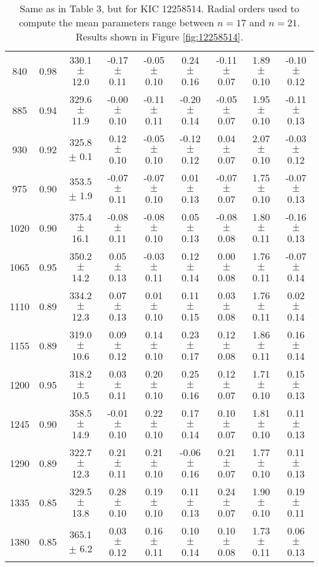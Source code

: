 \documentclass[twocolumn]{aastex61}%
\begin{document}
\begin{table*}[ht]
\begin{tabular}{ccc|ccccc|c}
840 & 0.98 & 330.1 $\pm$ 12.0 & -0.17 $\pm$ 0.11 & -0.05 $\pm$ 0.10 & 0.24 $\pm$ 0.16 & -0.11 $\pm$ 0.07 & 1.89 $\pm$ 0.10 & -0.10 $\pm$ 0.12\\
885 & 0.94 & 329.6 $\pm$ 11.9 & -0.00 $\pm$ 0.10 & -0.11 $\pm$ 0.11 & -0.20 $\pm$ 0.14 & -0.05 $\pm$ 0.07 & 1.95 $\pm$ 0.10 & -0.11 $\pm$ 0.13\\
930 & 0.92 & 325.8 $\pm$ 0.1 & 0.12 $\pm$ 0.10 & -0.05 $\pm$ 0.10 & -0.12 $\pm$ 0.12 & 0.04 $\pm$ 0.07 & 2.07 $\pm$ 0.10 & -0.03 $\pm$ 0.12\\
975 & 0.90 & 353.5 $\pm$ 1.9 & -0.07 $\pm$ 0.11 & -0.07 $\pm$ 0.10 & 0.01 $\pm$ 0.13 & -0.07 $\pm$ 0.07 & 1.75 $\pm$ 0.10 & -0.07 $\pm$ 0.13\\
1020 & 0.90 & 375.4 $\pm$ 16.1 & -0.08 $\pm$ 0.11 & -0.08 $\pm$ 0.10 & 0.05 $\pm$ 0.13 & -0.08 $\pm$ 0.08 & 1.80 $\pm$ 0.11 & -0.16 $\pm$ 0.13\\
1065 & 0.95 & 350.2 $\pm$ 14.2 & 0.05 $\pm$ 0.13 & -0.03 $\pm$ 0.11 & 0.12 $\pm$ 0.14 & 0.00 $\pm$ 0.08 & 1.76 $\pm$ 0.11 & -0.07 $\pm$ 0.14\\
1110 & 0.89 & 334.2 $\pm$ 12.3 & 0.07 $\pm$ 0.13 & 0.01 $\pm$ 0.10 & 0.11 $\pm$ 0.15 & 0.03 $\pm$ 0.08 & 1.76 $\pm$ 0.11 & 0.02 $\pm$ 0.14\\
1155 & 0.89 & 319.0 $\pm$ 10.6 & 0.09 $\pm$ 0.12 & 0.14 $\pm$ 0.10 & 0.23 $\pm$ 0.17 & 0.12 $\pm$ 0.08 & 1.86 $\pm$ 0.11 & 0.16 $\pm$ 0.14\\
1200 & 0.95 & 318.2 $\pm$ 10.5 & 0.03 $\pm$ 0.11 & 0.20 $\pm$ 0.10 & 0.25 $\pm$ 0.16 & 0.12 $\pm$ 0.07 & 1.71 $\pm$ 0.10 & 0.15 $\pm$ 0.13\\
1245 & 0.90 & 358.5 $\pm$ 14.9 & -0.01 $\pm$ 0.10 & 0.22 $\pm$ 0.10 & 0.17 $\pm$ 0.14 & 0.10 $\pm$ 0.07 & 1.81 $\pm$ 0.10 & 0.11 $\pm$ 0.13\\
1290 & 0.89 & 322.7 $\pm$ 12.3 & 0.21 $\pm$ 0.11 & 0.21 $\pm$ 0.10 & -0.06 $\pm$ 0.16 & 0.21 $\pm$ 0.07 & 1.77 $\pm$ 0.10 & 0.11 $\pm$ 0.13\\
1335 & 0.85 & 329.5 $\pm$ 13.8 & 0.28 $\pm$ 0.10 & 0.19 $\pm$ 0.10 & 0.11 $\pm$ 0.13 & 0.24 $\pm$ 0.07 & 1.90 $\pm$ 0.10 & 0.19 $\pm$ 0.11\\
1380 & 0.85 & 365.1 $\pm$ 6.2 & 0.03 $\pm$ 0.12 & 0.16 $\pm$ 0.11 & 0.10 $\pm$ 0.14 & 0.10 $\pm$ 0.08 & 1.73 $\pm$ 0.11 & 0.06 $\pm$ 0.13\\
\end{tabular}
\caption{Same as in Table 3, but for KIC 12258514. Radial orders used to compute the mean parameters range between $n=17$ and $n=21$. Results shown in Figure \ref{fig:12258514}.}\label{tab:12258514}
\end{table*}
\end{document}
